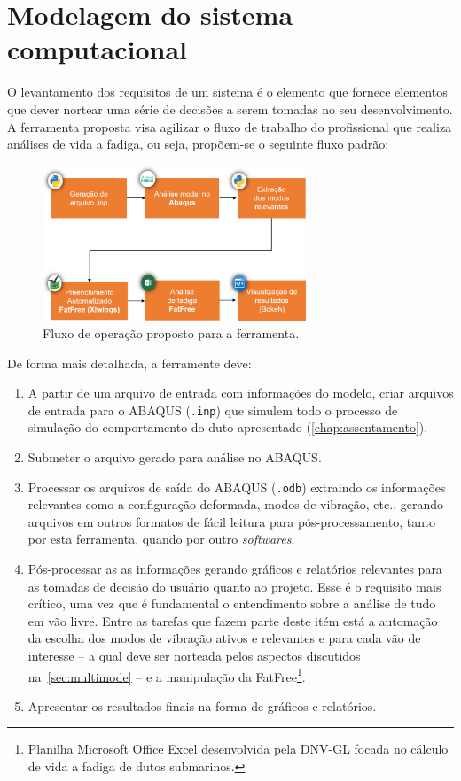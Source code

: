 \chapter{Modelagem do sistema computacional}\label{chap:software}

O levantamento dos requisitos de um sistema é o elemento que fornece elementos que dever nortear uma série de decisões a serem tomadas no seu desenvolvimento. A ferramenta proposta visa agilizar o fluxo de trabalho do profissional que realiza análises de vida a fadiga, ou seja, propõem-se o seguinte fluxo padrão:

\begin{figure}[!ht]
    \centering
    \caption{Fluxo de operação proposto para a ferramenta.}\label{fig:workflow}
    \includegraphics[width=0.7\textwidth]{imagens/workflow}
\end{figure}

De forma mais detalhada, a ferramente deve:

\begin{enumerate}
    \item A partir de um arquivo de entrada com informações do modelo, criar arquivos de entrada para o ABAQUS (\texttt{.inp}) que simulem todo o processo de simulação do comportamento do duto apresentado (\autoref{chap:assentamento}).
    \item Submeter o arquivo gerado para análise no ABAQUS.\@
    \item Processar os arquivos de saída do ABAQUS (\texttt{.odb}) extraindo os informações relevantes como a configuração deformada, modos de vibração, etc., gerando arquivos em outros formatos de fácil leitura para pós-processamento, tanto por esta ferramenta, quando por outro \textit{softwares}.
    \item Pós-processar as as informações gerando gráficos e relatórios relevantes para as tomadas de decisão do usuário quanto ao projeto. Esse é o requisito mais crítico, uma vez que é fundamental o entendimento sobre a análise de tudo em vão livre. Entre as tarefas que fazem parte deste itém está a automação da escolha dos modos de vibração ativos e relevantes e para cada vão de interesse -- a qual deve ser norteada pelos aspectos discutidos na~\autoref{sec:multimode} -- e a manipulação da FatFree\footnote{Planilha Microsoft Office Excel desenvolvida pela DNV-GL focada no cálculo de vida a fadiga de dutos submarinos.}.
    \item Apresentar os resultados finais na forma de gráficos e relatórios.
\end{enumerate}

